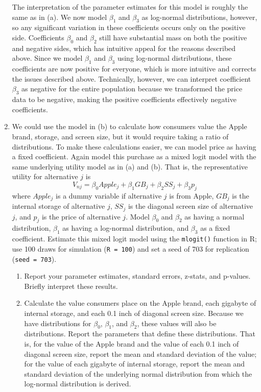 \documentclass[11pt,letterpaper]{article}\usepackage[]{graphicx}\usepackage[]{color}
\begin{document}
\begin{enumerate}[label=\alph*., leftmargin=*]
	The interpretation of the parameter estimates for this model is roughly the same as in (a). We now model $\beta_1$ and $\beta_3$ as log-normal distributions, however, so any significant variation in these coefficients occurs only on the positive side. Coefficients $\beta_0$ and $\beta_2$ still have substantial mass on both the positive and negative sides, which has intuitive appeal for the reasons described above. Since we model $\beta_1$ and $\beta_3$ using log-normal distributions, these coefficients are now positive for everyone, which is more intuitive and corrects the issues described above. Technically, however, we can interpret coefficient $\beta_3$ as negative for the entire population because we transformed the price data to be negative, making the positive coefficients effectively negative coefficients.

	\item We could use the model in (b) to calculate how consumers value the Apple brand, storage, and screen size, but it would require taking a ratio of distributions. To make these calculations easier, we can model price as having a fixed coefficient. Again model this purchase as a mixed logit model with the same underlying utility model as in (a) and (b). That is, the representative utility for alternative $j$ is
	$$V_{nj} = \beta_0 Apple_j + \beta_1 GB_j + \beta_2 SS_j + \beta_3 p_j$$
	where $Apple_j$ is a dummy variable if alternative $j$ is from Apple, $GB_j$ is the internal storage of alternative $j$, $SS_j$ is the diagonal screen size of alternative $j$, and $p_j$ is the price of alternative $j$. Model $\beta_0$ and $\beta_2$ as having a normal distribution, $\beta_1$ as having a log-normal distribution, and $\beta_3$ as a fixed coefficient. Estimate this mixed logit model using the \texttt{mlogit()} function in R; use 100 draws for simulation (\texttt{R = 100}) and set a seed of 703 for replication (\texttt{seed = 703}).
	\begin{enumerate}[label=\roman*.]
		\item Report your parameter estimates, standard errors, z-stats, and p-values. Briefly interpret these results. 
		\item Calculate the value consumers place on the Apple brand, each gigabyte of internal storage, and each 0.1 inch of diagonal screen size. Because we have distributions for $\beta_0$, $\beta_1$, and $\beta_2$, these values will also be distributions. Report the parameters that define these distributions. That is, for the value of the Apple brand and the value of each 0.1 inch of diagonal screen size, report the mean and standard deviation of the value; for the value of each gigabyte of internal storage, report the mean and standard deviation of the underlying normal distribution from which the log-normal distribution is derived.
	\end{enumerate}


\end{enumerate}
\end{document}
